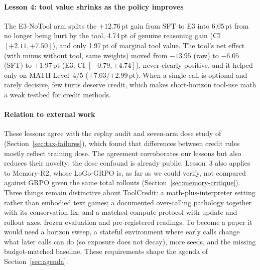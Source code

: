 \paragraph{Lesson 4: tool value shrinks as the policy improves}
The E3-NoTool arm splits the $+12.76$\,pt gain from SFT to E3 into 6.05\,pt from no longer being hurt by the tool, 4.74\,pt of genuine reasoning gain (CI $[+2.11, +7.50]$), and only 1.97\,pt of marginal tool value. The tool's net effect (with minus without tool, same weights) moved from $-13.95$ (raw) to $-6.05$ (SFT) to $+1.97$\,pt (E3, CI $[-0.79, +4.74]$), never clearly positive, and it helped only on MATH Level~4/5 ($+7.03$/$+2.99$\,pt). When a single call is optional and rarely decisive, few turns deserve credit, which makes short-horizon tool-use math a weak testbed for credit methods.

\paragraph{Relation to external work}
These lessons agree with the replay audit and seven-arm dose study of \citet{zhang2026credit} (Section~\ref{sec:tax-failures}), which found that differences between credit rules mostly reflect training dose\unverified. The agreement corroborates our lessons but also reduces their novelty: the dose confound is already public. Lesson~3 also applies to Memory-R2, whose LoGo-GRPO is, as far as we could verify, not compared against GRPO given the same total rollouts (Section~\ref{sec:memory-critique})\unverified. Three things remain distinctive about ToolCredit: a math-plus-interpreter setting rather than embodied text games; a documented over-calling pathology together with its conservation fix; and a matched-compute protocol with update and rollout axes, frozen evaluation and pre-registered readings. To become a paper it would need a horizon sweep, a stateful environment where early calls change what later calls can do (so exposure does not decay), more seeds, and the missing budget-matched baseline. These requirements shape the agenda of Section~\ref{sec:agenda}.
